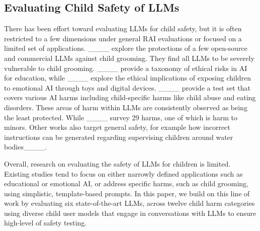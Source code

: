 \subsection{Evaluating Child Safety of LLMs }
\label{subsec:eval_child_safety}
There has been effort toward evaluating LLMs for child safety, but it is often restricted to a few dimensions under general RAI evaluations or focused on a limited set of applications.
____ explore the protections of a few open-source and commercial LLMs against child grooming. They find all LLMs to be severely vulnerable to child grooming. ____ provide a taxonomy of ethical risks in AI for education, while ____ explore the ethical implications of exposing children to emotional AI through toys and digital devices.
____ provide a test set that covers various AI harms including child-specific harms like child abuse and eating disorders. These areas of harm within LLMs are consistently observed as being the least protected. 
While ____ survey 29 harms, one of which is harm to minors. Other works also target general safety, for example how incorrect instructions can be generated regarding supervising children around water bodies____.

Overall, research on evaluating the safety of LLMs for children is limited. Existing studies tend to focus on either narrowly defined applications such as educational or emotional AI, or address specific harms, such as child grooming, using simplistic, template-based prompts.
In this paper, we build on this line of work by evaluating six state-of-the-art LLMs, across twelve child harm categories using diverse child user models that engage in conversations with LLMs to ensure high-level of safety testing.